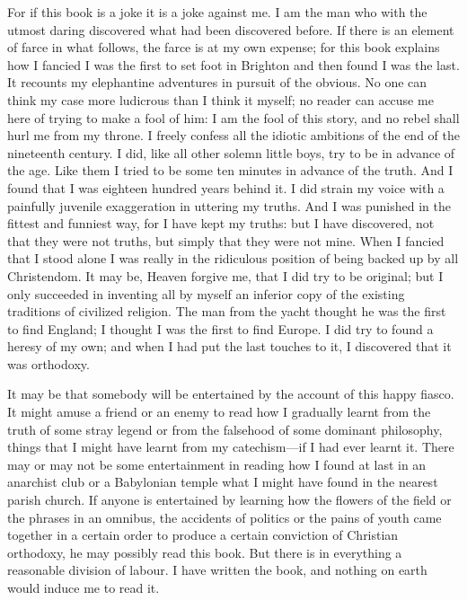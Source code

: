 \documentclass{book}
\begin{document}
For if this book is a joke it is a joke against me. I am the man who with the utmost daring discovered what had been discovered before. If there is an element of farce in what follows, the farce is at my own expense; for this book explains how I fancied I was the first to set foot in Brighton and then found I was the last. It recounts my elephantine adventures in pursuit of the obvious. No one can think my case more ludicrous than I think it myself; no reader can accuse me here of trying to make a fool of him: I am the fool of this story, and no rebel shall hurl me from my throne. I freely confess all the idiotic ambitions of the end of the nineteenth century. I did, like all other solemn little boys, try to be in advance of the age. Like them I tried to be some ten minutes in advance of the truth. And I found that I was eighteen hundred years behind it. I did strain my voice with a painfully juvenile exaggeration in uttering my truths. And I was punished in the fittest and funniest way, for I have kept my truths: but I have discovered, not that they were not truths, but simply that they were not mine. When I fancied that I stood alone I was really in the ridiculous position of being backed up by all Christendom. It may be, Heaven forgive me, that I did try to be original; but I only succeeded in inventing all by myself an inferior copy of the existing traditions of civilized religion. The man from the yacht thought he was the first to find England; I thought I was the first to find Europe. I did try to found a heresy of my own; and when I had put the last touches to it, I discovered that it was orthodoxy.

It may be that somebody will be entertained by the account of this happy fiasco. It might amuse a friend or an enemy to read how I gradually learnt from the truth of some stray legend or from the falsehood of some dominant philosophy, things that I might have learnt from my catechism—if I had ever learnt it. There may or may not be some entertainment in reading how I found at last in an anarchist club or a Babylonian temple what I might have found in the nearest parish church. If anyone is entertained by learning how the flowers of the field or the phrases in an omnibus, the accidents of politics or the pains of youth came together in a certain order to produce a certain conviction of Christian orthodoxy, he may possibly read this book. But there is in everything a reasonable division of labour. I have written the book, and nothing on earth would induce me to read it.
\end{document}
